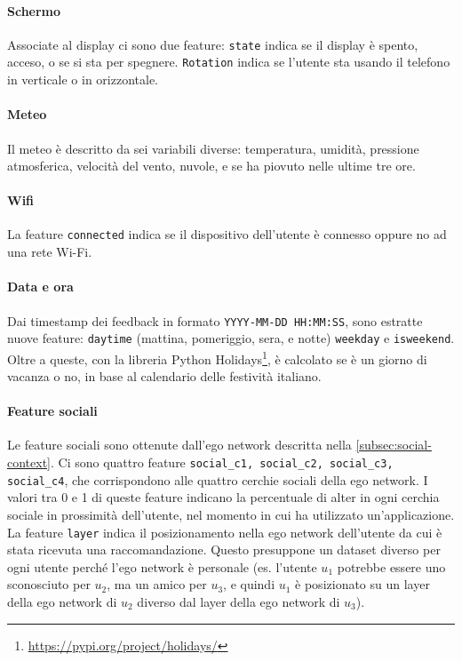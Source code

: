 \documentclass[12pt,italian]{report}
\begin{document}
\paragraph{Schermo} Associate al display ci sono due feature: \texttt{state} indica se il display è spento, acceso, o se si sta per spegnere. \texttt{Rotation} indica se l'utente sta usando il telefono in verticale o in orizzontale.

\paragraph{Meteo} Il meteo è descritto da sei variabili diverse: temperatura, umidità, pressione atmosferica, velocità del vento, nuvole, e se ha piovuto nelle ultime tre ore.

\paragraph{Wifi} La feature \texttt{connected} indica se il dispositivo dell'utente è connesso oppure no ad una rete Wi-Fi.

\paragraph{Data e ora} Dai timestamp dei feedback in formato \texttt{YYYY-MM-DD HH:MM:SS}, sono estratte nuove feature: \texttt{daytime} (mattina, pomeriggio, sera, e notte) \texttt{weekday} e \texttt{isweekend}. Oltre a queste, con la libreria Python Holidays\footnote{\url{https://pypi.org/project/holidays/}}, è calcolato se è un giorno di vacanza o no, in base al calendario delle festività italiano.

\paragraph{Feature sociali} Le feature sociali sono ottenute dall'ego network descritta nella \autoref{subsec:social-context}. Ci sono quattro feature \texttt{social\_c1, social\_c2, social\_c3, social\_c4}, che corrispondono alle quattro cerchie sociali della ego network. I valori tra 0 e 1 di queste feature indicano la percentuale di alter in ogni cerchia sociale in prossimità dell'utente, nel momento in cui ha utilizzato un'applicazione. La feature \texttt{layer} indica il posizionamento nella ego network dell'utente da cui è stata ricevuta una raccomandazione. Questo presuppone un dataset diverso per ogni utente perché l'ego network è personale (es. l'utente $u_1$ potrebbe essere uno sconosciuto per $u_2$, ma un amico per $u_3$, e quindi $u_1$ è posizionato su un layer della ego network di $u_2$ diverso dal layer della ego network di $u_3$).
\end{document}
